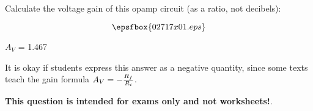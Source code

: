 

Calculate the voltage gain of this opamp circuit (as a ratio, not decibels):

$$\epsfbox{02717x01.eps}$$







$A_V$ = 1.467

\vskip 10pt

It is okay if students express this answer as a negative quantity, since some texts teach the gain formula $A_V = -{R_f \over R_i}$.







{\bf This question is intended for exams only and not worksheets!}.





